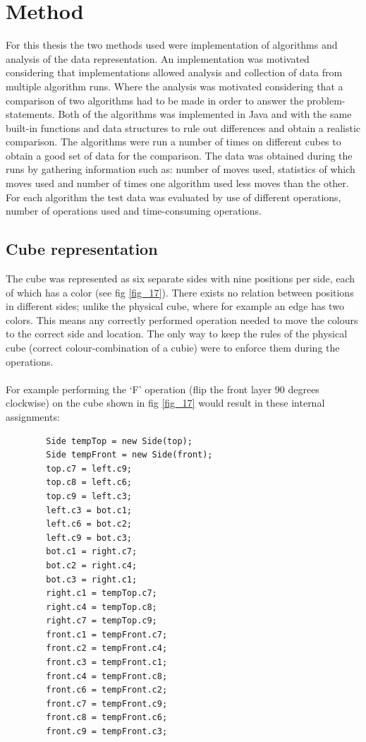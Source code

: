 \documentclass[a4paper,11pt]{kth-mag}
\begin{document}
\chapter{Method}
For this thesis the two methods used were implementation of algorithms and analysis of the data representation. An implementation was motivated considering that implementations allowed analysis and collection of data from multiple algorithm runs. Where the analysis was motivated considering that a comparison of two algorithms had to be made in order to answer the problem-statements.  
Both of the algorithms was implemented in Java and with the same built-in functions and data structures to rule out differences and obtain a realistic comparison.
The algorithms were run a number of times on different cubes to obtain a good set of data for the comparison. The data was obtained during the runs by gathering information such as: number of moves used, statistics of which moves used and number of times one algorithm used less moves than the other.  
For each algorithm the test data was evaluated by use of different operations, number of operations used and time-consuming operations.


\section{Cube representation}
 The cube was represented as six separate sides with nine positions per side, each of which has a color (see fig \ref{fig_17}). There exists no relation between positions in different sides; unlike the physical cube, where for example an edge has two colors. This means any correctly performed operation needed to move the colours to the correct side and location. The only way to keep the rules of the physical cube (correct colour-combination of a cubie) were to enforce them during the operations.\\\\
 For example performing the `F' operation (flip the front layer 90 degrees clockwise) on the cube shown in fig \ref{fig_17} would result in these internal assignments:
 \begin{verbatim}
		Side tempTop = new Side(top);
		Side tempFront = new Side(front);
		top.c7 = left.c9;
		top.c8 = left.c6;
		top.c9 = left.c3;
		left.c3 = bot.c1;
		left.c6 = bot.c2;
		left.c9 = bot.c3;
		bot.c1 = right.c7;
		bot.c2 = right.c4;
		bot.c3 = right.c1;
		right.c1 = tempTop.c7;
		right.c4 = tempTop.c8;
		right.c7 = tempTop.c9;
		front.c1 = tempFront.c7;
		front.c2 = tempFront.c4;
		front.c3 = tempFront.c1;
		front.c4 = tempFront.c8;
		front.c6 = tempFront.c2;
		front.c7 = tempFront.c9;
		front.c8 = tempFront.c6;
		front.c9 = tempFront.c3;
\end{verbatim}
\end{document}
